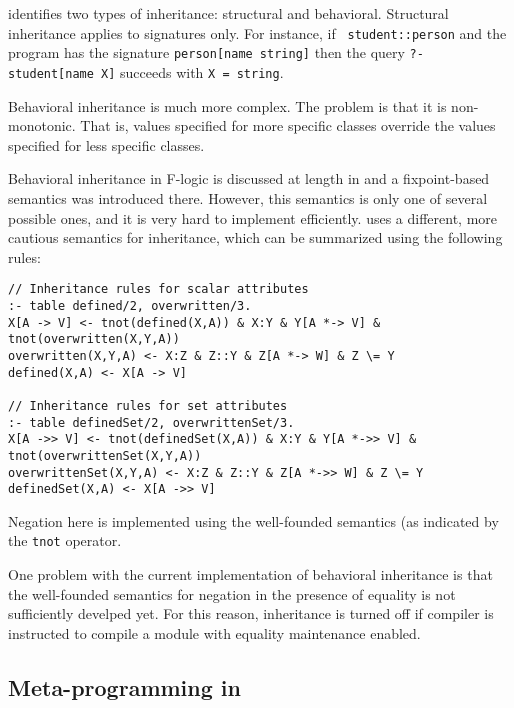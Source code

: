 \documentclass[11pt]{report}
\begin{document}
\fl identifies two types of inheritance: structural and behavioral.
Structural inheritance applies to signatures only. For instance, if {\tt
  student::person} and the program has the signature {\tt person[name \Fd
string]} then the query {\tt ?- student[name \Fd X]} succeeds with {\tt X =
string}.

Behavioral inheritance is much more complex. The problem  is that it is
non-monotonic. That is, values specified for more specific classes override
the values specified for less specific classes.

Behavioral inheritance in F-logic is discussed at length in \cite{KLW95}
and a fixpoint-based semantics was introduced there. However, this
semantics is only one of several possible ones, and it is very hard to
implement efficiently. \FLORA uses a different, more cautious semantics for
inheritance, which can be summarized using the following rules:
\begin{verbatim}
// Inheritance rules for scalar attributes
:- table defined/2, overwritten/3.
X[A -> V] <- tnot(defined(X,A)) & X:Y & Y[A *-> V] & tnot(overwritten(X,Y,A))
overwritten(X,Y,A) <- X:Z & Z::Y & Z[A *-> W] & Z \= Y
defined(X,A) <- X[A -> V]

// Inheritance rules for set attributes
:- table definedSet/2, overwrittenSet/3.
X[A ->> V] <- tnot(definedSet(X,A)) & X:Y & Y[A *->> V] & tnot(overwrittenSet(X,Y,A))
overwrittenSet(X,Y,A) <- X:Z & Z::Y & Z[A *->> W] & Z \= Y
definedSet(X,A) <- X[A ->> V]
\end{verbatim}
Negation here is implemented using the well-founded semantics (as indicated
by the {\tt tnot} operator.

One problem with the current implementation of behavioral inheritance is
that the well-founded semantics for negation in the presence of equality is
not sufficiently develped yet. For this reason, inheritance is turned off
if \FLORA compiler is instructed to compile a \FLORA module with equality
maintenance enabled.

\subsection{Meta-programming in \FLORA}
\end{document}
